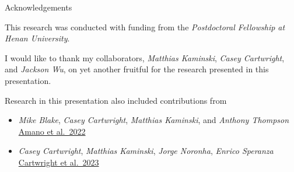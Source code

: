\documentclass[xcolor=dvipsnames]{beamer}
\begin{document}
\begin{frame}{Acknowledgements}

  This research was conducted with funding from the \emph{Postdoctoral
  Fellowship at Henan University}.

  \vfill 

  I would like to thank my collaborators, \emph{Matthias Kaminski},
  \emph{Casey Cartwright}, and \emph{Jackson Wu}, on yet another fruitful
  for the research presented in this presentation.

  \vfill 

  Research in this presentation also included contributions from

  \begin{itemize}
    \item
      \emph{Mike Blake}, \emph{Casey Cartwright}, \emph{Matthias Kaminski},
      and \emph{Anthony Thompson}\\
      \href{https://inspirehep.net/literature/2174613}{Amano et al.~2022}
    \item
      \emph{Casey Cartwright}, \emph{Matthias Kaminski}, \emph{Jorge
      Noronha}, \emph{Enrico Speranza}\\
      \href{https://inspirehep.net/literature/1994753}{Cartwright et
      al.~2023}
  \end{itemize}
\end{frame}




\end{document}
